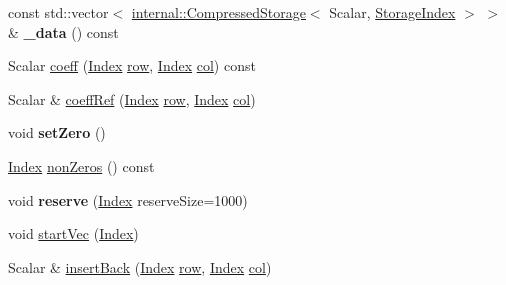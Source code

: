 \begin{DoxyCompactItemize}
const std\+::vector$<$ \hyperlink{class_eigen_1_1internal_1_1_compressed_storage}{internal\+::\+Compressed\+Storage}$<$ Scalar, \hyperlink{group___sparse_core___module_a0b540ba724726ebe953f8c0df06081ed}{Storage\+Index} $>$ $>$ \& {\bfseries \+\_\+data} () const
\item 
Scalar \hyperlink{class_eigen_1_1_dynamic_sparse_matrix_a64b7d586c6b212dbe912a9ee05c3a85a}{coeff} (\hyperlink{group___core___module_a554f30542cc2316add4b1ea0a492ff02}{Index} \hyperlink{group___sparse_core___module_ac0a5563ed3f243f013fb9d2c17e230d0}{row}, \hyperlink{group___core___module_a554f30542cc2316add4b1ea0a492ff02}{Index} \hyperlink{group___sparse_core___module_a8f4eaa3c3921ef3823ffc69ebcc356af}{col}) const
\item 
Scalar \& \hyperlink{class_eigen_1_1_dynamic_sparse_matrix_a17093cd39bd0e6ebd6250bc5feb61a0f}{coeff\+Ref} (\hyperlink{group___core___module_a554f30542cc2316add4b1ea0a492ff02}{Index} \hyperlink{group___sparse_core___module_ac0a5563ed3f243f013fb9d2c17e230d0}{row}, \hyperlink{group___core___module_a554f30542cc2316add4b1ea0a492ff02}{Index} \hyperlink{group___sparse_core___module_a8f4eaa3c3921ef3823ffc69ebcc356af}{col})
\item 
\mbox{\label{class_eigen_1_1_dynamic_sparse_matrix_a2fed9a448bebd78ec98c30c3d2ec5407}} 
void {\bfseries set\+Zero} ()
\item 
\hyperlink{group___core___module_a554f30542cc2316add4b1ea0a492ff02}{Index} \hyperlink{class_eigen_1_1_dynamic_sparse_matrix_a473cd00ddc0319327f4c8a6c82ec96cf}{non\+Zeros} () const
\item 
\mbox{\label{class_eigen_1_1_dynamic_sparse_matrix_a20a85be37e667a2c639ae99ee58443cf}} 
void {\bfseries reserve} (\hyperlink{group___core___module_a554f30542cc2316add4b1ea0a492ff02}{Index} reserve\+Size=1000)
\item 
void \hyperlink{class_eigen_1_1_dynamic_sparse_matrix_a294b998a50cc01859425e5e7c23d6108}{start\+Vec} (\hyperlink{group___core___module_a554f30542cc2316add4b1ea0a492ff02}{Index})
\item 
Scalar \& \hyperlink{class_eigen_1_1_dynamic_sparse_matrix_a0a556652195b91c09e9f6c4d8b7cc81d}{insert\+Back} (\hyperlink{group___core___module_a554f30542cc2316add4b1ea0a492ff02}{Index} \hyperlink{group___sparse_core___module_ac0a5563ed3f243f013fb9d2c17e230d0}{row}, \hyperlink{group___core___module_a554f30542cc2316add4b1ea0a492ff02}{Index} \hyperlink{group___sparse_core___module_a8f4eaa3c3921ef3823ffc69ebcc356af}{col})

\end{DoxyCompactItemize}
